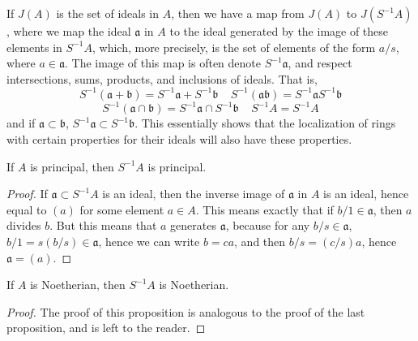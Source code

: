 If $J(A)$ is the set of ideals in $A$, then we have a map from $J(A)$ to $J(S^{-1}A)$, where we map the ideal $\mathfrak{a}$ in $A$ to the ideal generated by the image of these elements in $S^{-1}A$, which, more precisely, is the set of elements of the form $a/s$, where $a \in \mathfrak{a}$. The image of this map is often denote $S^{-1}\mathfrak{a}$, and respect intersections, sums, products, and inclusions of ideals. That is,
%
\[ S^{-1}(\mathfrak{a} + \mathfrak{b}) = S^{-1}\mathfrak{a} + S^{-1}\mathfrak{b}\ \ \ \ \ S^{-1}(\mathfrak{a} \mathfrak{b}) = S^{-1} \mathfrak{a} S^{-1} \mathfrak{b} \]
\[ S^{-1}(\mathfrak{a} \cap \mathfrak{b}) = S^{-1}\mathfrak{a} \cap S^{-1} \mathfrak{b}\ \ \ \ \ S^{-1}A = S^{-1}A \]
%
and if $\mathfrak{a} \subset \mathfrak{b}$, $S^{-1}\mathfrak{a} \subset S^{-1}\mathfrak{b}$. This essentially shows that the localization of rings with certain properties for their ideals will also have these properties.

\begin{prop}
    If $A$ is principal, then $S^{-1}A$ is principal.
\end{prop}
\begin{proof}
    If $\mathfrak{a} \subset S^{-1}A$ is an ideal, then the inverse image of $\mathfrak{a}$ in $A$ is an ideal, hence equal to $(a)$ for some element $a \in A$. This means exactly that if $b/1 \in \mathfrak{a}$, then $a$ divides $b$. But this means that $a$ generates $\mathfrak{a}$, because for any $b/s \in \mathfrak{a}$, $b/1 = s(b/s) \in \mathfrak{a}$, hence we can write $b = ca$, and then $b/s = (c/s)a$, hence $\mathfrak{a} = (a)$.
\end{proof}

\begin{prop}
    If $A$ is Noetherian, then $S^{-1}A$ is Noetherian.
\end{prop}
\begin{proof}
    The proof of this proposition is analogous to the proof of the last proposition, and is left to the reader.
\end{proof}

